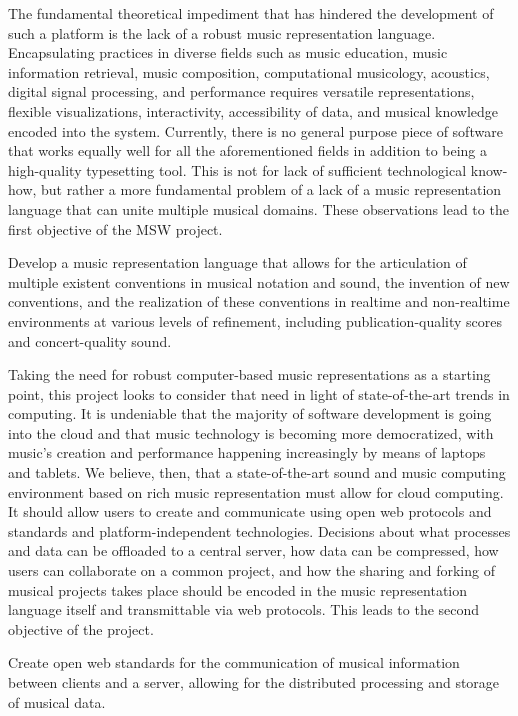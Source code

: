 \documentclass{article}
\begin{document}
The fundamental theoretical impediment that has hindered the development of
such a platform is the lack of a robust music representation language.
Encapsulating practices in diverse fields such as music education, music
information retrieval, music composition, computational musicology,
acoustics, digital signal processing, and performance requires versatile representations, flexible
visualizations, interactivity, accessibility of data, and musical knowledge
encoded into the system. Currently, there is no general purpose piece of
software that works equally well for all the aforementioned fields in
addition to being a high-quality typesetting tool. This is not for lack of
sufficient technological know-how, but rather a more fundamental problem of
a lack of a music representation language that can unite multiple musical
domains. These observations lead to the first objective of the MSW project.
\begin{objective}
Develop a music representation language that allows for the articulation of multiple
existent conventions in musical notation and sound, the invention of new
conventions, and the realization of these conventions in realtime and
non-realtime environments at various levels of refinement, including
publication-quality scores and concert-quality sound.
\end{objective}
Taking the need for robust computer-based music representations as a
starting point, this project looks to consider that need in light of
state-of-the-art trends in computing. It is undeniable that the majority of
software development is going into the cloud and that music technology is
becoming more democratized, with music’s creation and performance happening
increasingly by means of laptops and tablets. We believe, then, that a
state-of-the-art sound and music computing environment based on rich music
representation must allow for cloud computing. It should allow users to
create and communicate using open web protocols and standards and platform-independent
technologies. Decisions about what processes and data can be offloaded to a
central server, how data can be compressed, how users can collaborate on a
common project, and how the sharing and forking of musical projects takes
place should be encoded in the music representation language itself and
transmittable via web protocols. This leads to the second objective of the
project.
\begin{objective}
Create open web standards for the communication of musical
information between clients and a server, allowing for the distributed
processing and storage of musical data.
\end{objective}
\end{document}
